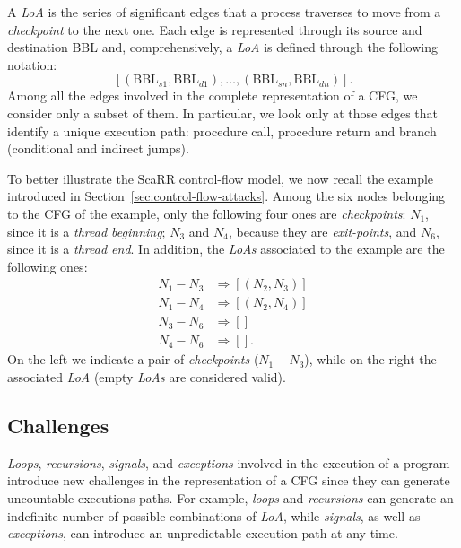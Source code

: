 A \emph{LoA} is the series of significant edges that a process traverses to 
move from a \emph{checkpoint} to the next one. Each edge is represented through 
its source and destination BBL and, comprehensively, a \emph{LoA} is defined 
through the following notation:
$$
[(\text{BBL}_{s1},\text{BBL}_{d1}), \dots, (\text{BBL}_{sn},\text{BBL}_{dn})].
$$
Among all the edges involved in the complete representation of a CFG, we 
consider only a subset of them.
In particular, we look only at those edges that identify a unique execution 
path: procedure call, procedure return and branch (\ie conditional and indirect 
jumps). 

To better illustrate the ScaRR control-flow model, we now recall the example 
introduced in Section~\ref{sec:control-flow-attacks}. 
Among the six nodes belonging to the CFG of the example, only the following 
four ones are \emph{checkpoints}: $N_1$, since it is a \emph{thread beginning}; 
$N_3$ and $N_4$, because they are \emph{exit-points}, and $N_6$, since it is a 
\emph{thread end}. In addition, the \emph{LoAs} associated to the example are 
the following ones:  
\begin{equation*}
\begin{split}
N_1-N_3 &\Rightarrow [(N_2, N_3)] \\    
N_1-N_4 &\Rightarrow [(N_2, N_4)] \\ 
N_3-N_6 &\Rightarrow [] \\
N_4-N_6 &\Rightarrow [].
\end{split}
\end{equation*}
On the left we indicate a pair of \emph{checkpoints} (\eg $N_1-N_3$), while on 
the right the associated \emph{LoA} (empty \emph{LoAs} are considered valid).

\subsection{Challenges}
\label{ssec:challenges}
\emph{Loops}, \emph{recursions}, \emph{signals}, and \emph{exceptions} involved 
in the execution of a program introduce new challenges in the representation of 
a CFG since they can generate uncountable executions paths. For example, 
\emph{loops} and \emph{recursions} can generate an indefinite number of 
possible combinations of \emph{LoA}, while \emph{signals}, as well as 
\emph{exceptions}, can introduce an unpredictable execution path at any time.

